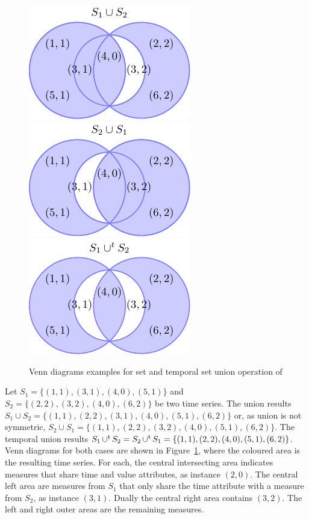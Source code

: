 \begin{figure}
  \centering
  \includegraphics{fig_model_venn.pdf}
  \includegraphics{fig_model_venn_reverse.pdf}
  \includegraphics{fig_model_venn2.pdf}
  \caption{Venn diagrams examples for set and temporal set union
    operation of }
  \label{fig:model:venn}
\end{figure}


\begin{example}\label{ex:model:s1s2}
  Let $S_1=\{(1,1),(3,1),(4,0),(5,1)\}$ and $S_2 = \allowbreak
  \{\allowbreak (2,\allowbreak 2),\allowbreak (3,2),(4,0),(6,2)\}$ be
  two time series. The union results $S_1 \cup S_2 =
  \{(1,1),\allowbreak (2,2),\allowbreak (3,1),\allowbreak (4,
  0),\allowbreak (5,1),\allowbreak (6,2)\}$ or, as union is not
  symmetric, $S_2 \cup S_1 = \{(1,1),\allowbreak (2,2),\allowbreak
  (3,2),\allowbreak (4, 0),\allowbreak (5,1),\allowbreak (6,2)\}$. The
  temporal union results $S_1 \operatorname*{\cup^t} S_2 = S_2 \operatorname*{\cup^t} S_1 =
  \{(1,1),\allowbreak (2,2),\allowbreak (4,0),(5,1),\allowbreak
  (6,2)\}$. %
  Venn diagrams for both cases are shown in
  Figure~\ref{fig:model:venn}, where the coloured area is the
  resulting time series. For each, the central intersecting area
  indicates measures that share time and value attributes, as instance
  $(2,0)$. The central left area are measures from $S_1$ that only
  share the time attribute with a measure from $S_2$, as instance
  $(3,1)$. Dually the central right area contains $(3,2)$. The left
  and right outer areas are the remaining measures.
 \end{example}





